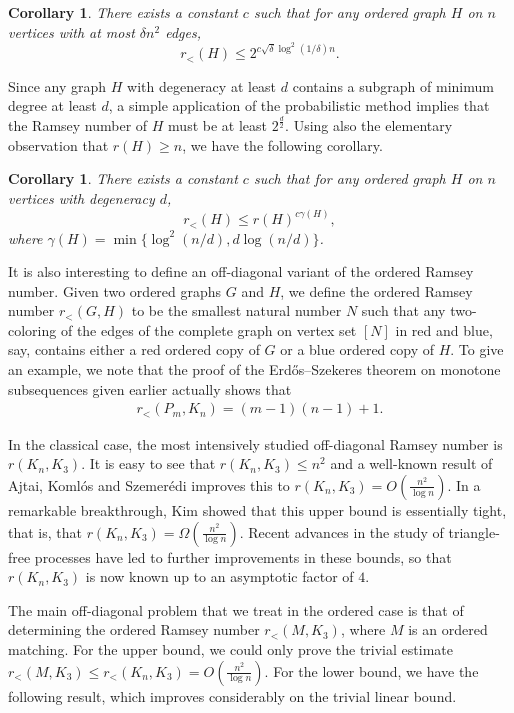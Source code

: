 \documentclass[11pt]{article}
\newtheorem{corollary}[theorem]{Corollary}
\newcommand{\rord}{r_{<}}
\begin{document}
\begin{corollary}
There exists a constant $c$ such that for any ordered graph $H$ on $n$ vertices with at most $\delta n^2$ edges,
\[r_<(H) \leq 2^{c \sqrt{\delta} \log^2(1/\delta) n}.\]
\end{corollary}

Since any graph $H$ with degeneracy at least $d$ contains a subgraph of minimum degree at least $d$, a simple application of the probabilistic method implies that the Ramsey number of $H$ must be at least $2^\frac{d}{2}$. Using also the elementary observation that $r(H) \geq n$, we have the following corollary.

\begin{corollary}
There exists a constant $c$ such that for any ordered graph $H$ on $n$ vertices with degeneracy $d$,
\[r_<(H) \leq r(H)^{c \gamma(H)},\]
where $\gamma(H) = \min\{\log^2(n/d), d \log(n/d)\}$.
\end{corollary}

It is also interesting to define an off-diagonal variant of the ordered Ramsey number. Given two ordered graphs $G$ and $H$, we define the ordered Ramsey number $r_<(G, H)$ to be the smallest natural number $N$ such that any two-coloring of the edges of the complete graph on vertex set $[N]$ in red and blue, say, contains either a red ordered copy of $G$ or a blue ordered copy of $H$. To give an example, we note that the proof of the Erd\H{o}s--Szekeres theorem on monotone subsequences given earlier actually shows that
\begin{align} \label{eq:es_offdiagonal}
	\rord(P_m, K_n) = (m-1)(n-1) + 1.
\end{align}

In the classical case, the most intensively studied off-diagonal Ramsey number is $r(K_n, K_3)$. It is easy to see that $r(K_n, K_3) \leq n^2$ and a well-known result of Ajtai, Koml\'os and Szemer\'edi \cite{AKS80} improves this to $r(K_n, K_3) = O(\frac{n^2}{\log n})$. In a remarkable breakthrough, Kim \cite{K95} showed that this upper bound is essentially tight, that is, that $r(K_n, K_3) = \Omega(\frac{n^2}{\log n})$. Recent advances in the study of triangle-free processes \cite{BK14, FGM14} have led to further improvements in these bounds, so that $r(K_n, K_3)$ is now known up to an asymptotic factor of $4$. 

The main off-diagonal problem that we treat in the ordered case is that of determining the ordered Ramsey number $r_<(M, K_3)$, where $M$ is an ordered matching. For the upper bound, we could only prove the trivial estimate $r_<(M, K_3) \leq r_<(K_n, K_3) = O(\frac{n^2}{\log n})$. For the lower bound, we have the following result, which improves considerably on the trivial linear bound.
\end{document}
